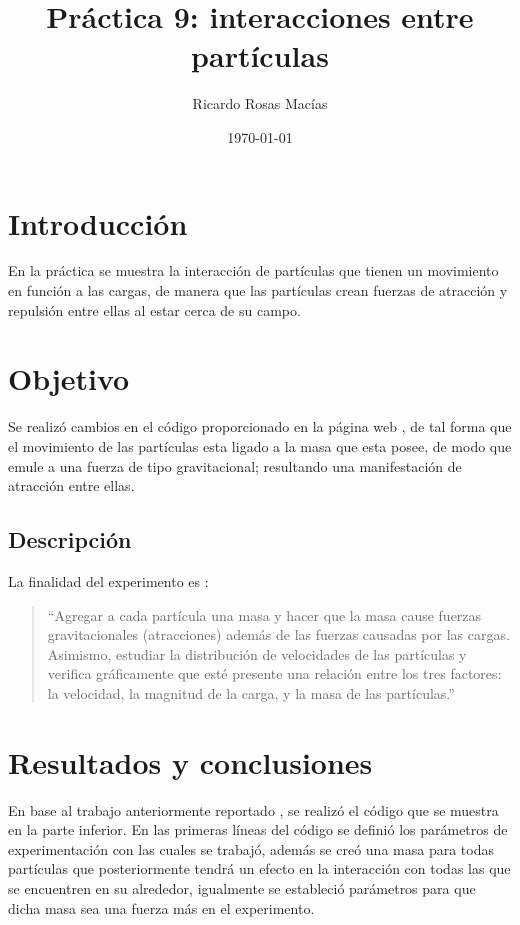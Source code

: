 \documentclass[12pt, letterpaper] {article}
\author{Ricardo Rosas Macías}
\title{Práctica 9: interacciones entre partículas}
\date{\today}
\begin{document}
\maketitle


\section{Introducción}
En la práctica se muestra la interacción de partículas que tienen un movimiento en función a las cargas, de manera que las partículas crean fuerzas de atracción y repulsión entre ellas al estar cerca de su campo. 

 \section{Objetivo}
Se realizó cambios en el c\'odigo proporcionado en la p\'agina web \cite{elisawebIEP}, de tal forma que el movimiento de las partículas esta ligado a la masa que esta posee, de modo que emule a una fuerza de tipo gravitacional; resultando una manifestación de atracción entre ellas. 
 
 \subsection{Descripción}
 
La finalidad del experimento es \cite{elisawebIEP}:
\begin{quotation}
 ``Agregar a cada partícula una masa y hacer que la masa cause fuerzas gravitacionales (atracciones) además de las fuerzas causadas por las cargas. Asimismo, estudiar la distribución de velocidades de las partículas y verifica gráficamente que esté presente una relación entre los tres factores: la velocidad, la magnitud de la carga, y la masa de las partículas.''
\end{quotation}

\section{Resultados y conclusiones}

En base al trabajo anteriormente reportado \cite{PG9}\cite{MP9}, se realizó el código que se muestra en la parte inferior. En las primeras líneas del c\'odigo se defini\'o los par\'ametros de experimentaci\'on con las cuales se trabajó, además se creó una masa para todas partículas que posteriormente tendrá un efecto en la interacción con todas las que se encuentren en su alrededor, igualmente se estableció parámetros para que dicha masa sea una fuerza más en el experimento. 
\end{document}

